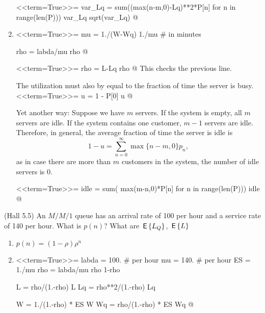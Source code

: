 \begin{exercise}
\begin{solution}
\begin{enumerate}
<<term=True>>=
var_Lq = sum((max(n-m,0)-Lq)**2*P[n] for n in range(len(P)))
var_Lq
sqrt(var_Lq)
@ 

\item 

<<term=True>>=
mu = 1./(W-Wq)
1./mu # in minutes

rho = labda/mu
rho
@ 

<<term=True>>=
rho = L-Lq
rho
@ 
This checks the previous line.

The utilization must also by equal to the fraction of time the server is busy. 
<<term=True>>=
u = 1 - P[0]
u
@ 

Yet another way: Suppose we have $m$ servers. If the system is empty,
all $m$ servers are idle. If the system contains one customer, $m-1$
servers are idle. Therefore, in general, the average fraction of time
the server is idle is
\begin{equation*}
1- u = \sum_{n=0}^\infty \max\{n-m, 0\}  p_n,
\end{equation*}
as in case there are more than $m$ customers in the system, the
number of idle servers is $0$.


<<term=True>>=
idle = sum( max(m-n,0)*P[n] for n in range(len(P)))
idle
@ 
  \end{enumerate}
   \end{solution}
 
\end{exercise}

\begin{exercise}
  (Hall 5.5) An $M/M/1$ queue has an arrival rate of 100 per hour and
  a service rate of 140 per hour.
 What is $p(n)$?  What are $\,\mathsf{E}\left\{L_Q\right\}$, $\,\mathsf{E}\left\{L\right\}$ 
\begin{solution}
  \begin{enumerate}
  \item 
$p(n) = (1-\rho)\rho^n$

\item 

<<term=True>>=
labda = 100. # per hour
mu = 140. # per hour
ES = 1./mu
rho = labda/mu
rho 
1-rho

L = rho/(1.-rho)
L
Lq = rho**2/(1.-rho)
Lq

W = 1./(1.-rho) * ES
W
Wq = rho/(1.-rho) * ES
Wq
@ 
  \end{enumerate}
  \end{solution}
\end{exercise}

